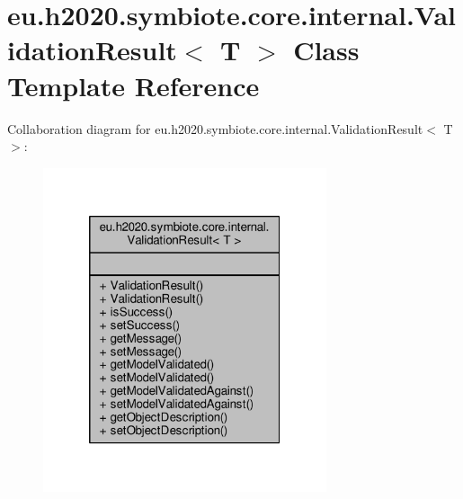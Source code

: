 \hypertarget{classeu_1_1h2020_1_1symbiote_1_1core_1_1internal_1_1ValidationResult}{}\section{eu.\+h2020.\+symbiote.\+core.\+internal.\+Validation\+Result$<$ T $>$ Class Template Reference}
\label{classeu_1_1h2020_1_1symbiote_1_1core_1_1internal_1_1ValidationResult}


Collaboration diagram for eu.\+h2020.\+symbiote.\+core.\+internal.\+Validation\+Result$<$ T $>$\+:\nopagebreak
\begin{figure}[H]
\begin{center}
\leavevmode
\includegraphics[width=236pt]{classeu_1_1h2020_1_1symbiote_1_1core_1_1internal_1_1ValidationResult__coll__graph}
\end{center}
\end{figure}
